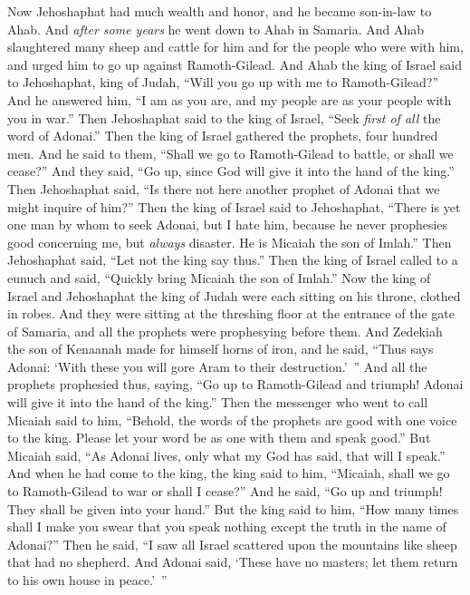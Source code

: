 \begin{biblechapter} %
 Now Jehoshaphat had much wealth and honor, and he became son-in-law to Ahab.
\verse And \textit{after some years} he went down to Ahab in Samaria. And Ahab slaughtered many sheep and cattle for him and for the people who were with him, and urged him to go up against Ramoth-Gilead.
\verse And Ahab the king of Israel said to Jehoshaphat, king of Judah, “Will you go up with me to Ramoth-Gilead?” And he answered him, “I am as you are, and my people are as your people with you in war.”
\verse Then Jehoshaphat said to the king of Israel, “Seek \textit{first of all} the word of Adonai.”
\verse Then the king of Israel gathered the prophets, four hundred men. And he said to them, “Shall we go to Ramoth-Gilead to battle, or shall we cease?” And they said, “Go up, since God will give it into the hand of the king.”
\verse Then Jehoshaphat said, “Is there not here another prophet of Adonai that we might inquire of him?”
\verse Then the king of Israel said to Jehoshaphat, “There is yet one man by whom to seek Adonai, but I hate him, because he never prophesies good concerning me, but \textit{always} disaster. He is Micaiah the son of Imlah.” Then Jehoshaphat said, “Let not the king say thus.”
\verse Then the king of Israel called to a eunuch and said, “Quickly bring Micaiah the son of Imlah.”
\verse Now the king of Israel and Jehoshaphat the king of Judah were each sitting on his throne, clothed in robes. And they were sitting at the threshing floor at the entrance of the gate of Samaria, and all the prophets were prophesying before them.
\verse And Zedekiah the son of Kenaanah made for himself horns of iron, and he said, “Thus says Adonai: ‘With these you will gore Aram to their destruction.’ ”
\verse And all the prophets prophesied thus, saying, “Go up to Ramoth-Gilead and triumph! Adonai will give it into the hand of the king.”
\verse Then the messenger who went to call Micaiah said to him, “Behold, the words of the prophets are good with one voice to the king. Please let your word be as one with them and speak good.”
\verse But Micaiah said, “As Adonai lives, only what my God has said, that will I speak.”
\verse And when he had come to the king, the king said to him, “Micaiah, shall we go to Ramoth-Gilead to war or shall I cease?” And he said, “Go up and triumph! They shall be given into your hand.”
\verse But the king said to him, “How many times shall I make you swear that you speak nothing except the truth in the name of Adonai?”
\verse Then he said, “I saw all Israel scattered upon the mountains like sheep that had no shepherd. And Adonai said, ‘These have no masters; let them return to his own house in peace.’ ”

\end{biblechapter}
